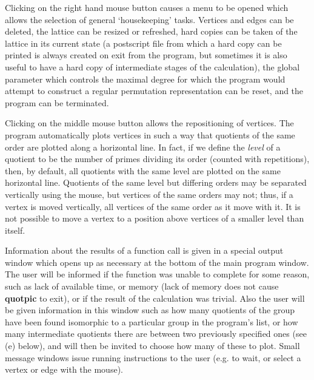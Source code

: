 Clicking on the right hand mouse button causes a menu to be opened which 
allows the selection of general `housekeeping' tasks.  Vertices and edges can
be deleted, the lattice can be resized or refreshed, hard copies can be taken 
of the lattice in its current state (a postscript file from which
a hard copy can be printed is always created on exit from the program, but 
sometimes it is also useful to have a hard copy of intermediate stages of the 
calculation), the global parameter which controls the maximal degree for
which the program would attempt to construct a regular permutation 
representation can be reset, and the program can be terminated. 

Clicking on the middle mouse 
button allows the repositioning of vertices. The program automatically
plots  vertices in such a way that  quotients of the same order are plotted
along a horizontal line. In fact, if we define the {\it level} of a quotient
to be the number of primes dividing its order (counted with repetitions), then,
by default, all quotients with the same level are plotted on the same
horizontal line. Quotients of the same level but differing orders may be 
separated vertically using the mouse, but vertices of the same 
orders may not; thus, if a vertex is moved vertically, all vertices of
the same order as it move with it. It is not possible to move a vertex
to a position above vertices of a smaller level than itself.

Information about the results of a function call is given in a special
output window which opens up as necessary at the bottom of the main program 
window. The user will be informed if the function was unable to complete
for some reason, such as lack of available time, or memory (lack of
memory does not cause {\bf quotpic} to exit), or if the result of
the calculation was trivial. Also the user will be given information in this 
window such as how many quotients of the group have been found isomorphic to a
particular group in the program's list, or how many intermediate
quotients there are between two previously specified ones (see (e) below),
and will then be
invited to choose how many of these to plot. Small message windows issue running
instructions to the user (e.g. to wait, or select a vertex or edge with the
mouse).

